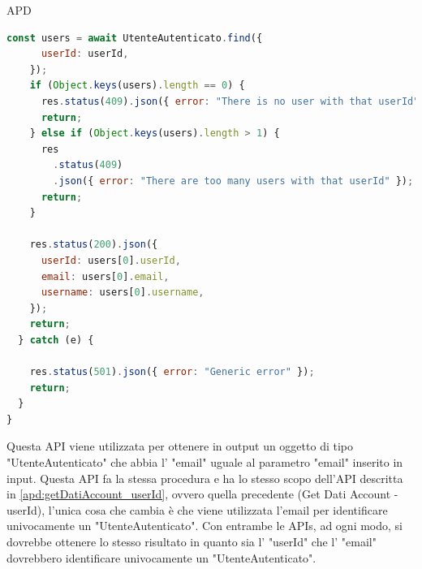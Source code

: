 \begin{listaPersonale} {APD}
\begin{listaPersonale2}[APD]{}
\begin{lstlisting}[language=JavaScript]
    const users = await UtenteAutenticato.find({
      userId: userId,
    });
    if (Object.keys(users).length == 0) {
      res.status(409).json({ error: "There is no user with that userId" });
      return;
    } else if (Object.keys(users).length > 1) {
      res
        .status(409)
        .json({ error: "There are too many users with that userId" });
      return;
    }

    res.status(200).json({
      userId: users[0].userId,
      email: users[0].email,
      username: users[0].username,
    });
    return;
  } catch (e) {
    
    res.status(501).json({ error: "Generic error" });
    return;
  }
}
                \end{lstlisting}
                \newpage
                Questa API viene utilizzata per ottenere in output un oggetto di tipo "UtenteAutenticato" che abbia l' "email" uguale al parametro "email" inserito in input. Questa API fa la stessa procedura e ha lo stesso scopo dell'API descritta in \ref{apd:getDatiAccount_userId}, ovvero quella precedente (Get Dati Account - userId), l'unica cosa che cambia è che viene utilizzata l'email per identificare univocamente un "UtenteAutenticato". Con entrambe le APIs, ad ogni modo, si dovrebbe ottenere lo stesso risultato in quanto sia l' "userId" che l' "email" dovrebbero identificare univocamente un "UtenteAutenticato".

\end{listaPersonale2}
\end{listaPersonale}
